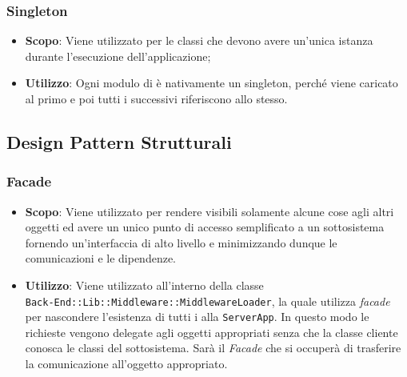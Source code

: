 \subsubsection{Singleton}

\begin{itemize}

	\item \textbf{Scopo}: Viene utilizzato per le classi che devono avere un'unica istanza durante l'esecuzione dell'applicazione;
	\item \textbf{Utilizzo}: Ogni modulo di  è nativamente un singleton, perché viene caricato al primo  e poi tutti i successivi riferiscono allo stesso.

\end{itemize}

\subsection{Design Pattern Strutturali}

\subsubsection{Facade}

\begin{itemize}

	\item \textbf{Scopo}: Viene utilizzato per rendere visibili solamente alcune cose agli altri oggetti ed avere un unico punto di accesso semplificato a un sottosistema fornendo un'interfaccia di alto livello e minimizzando dunque le comunicazioni e le dipendenze.
	\item \textbf{Utilizzo}: Viene utilizzato all'interno della classe \\ \texttt{Back-End::Lib::Middleware::MiddlewareLoader}, la quale utilizza \textit{facade} per nascondere l'esistenza di tutti i  alla \texttt{ServerApp}. In questo modo le richieste vengono delegate agli oggetti appropriati senza che la classe cliente conosca le classi del sottosistema. Sarà il \textit{Facade} che si occuperà di trasferire la comunicazione all'oggetto appropriato.
\end{itemize}

